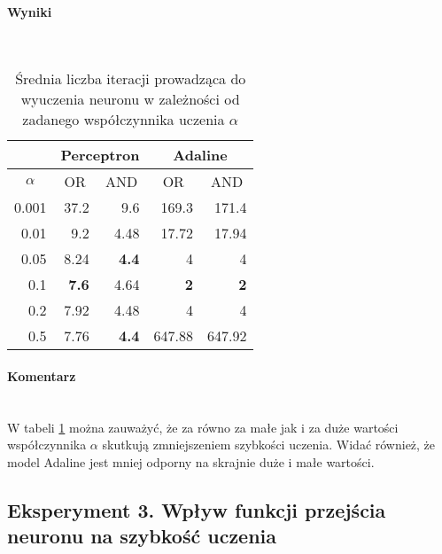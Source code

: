 \documentclass{article}
\begin{document}
	\paragraph{Wyniki}\mbox{}\\
	\begin{table}[H]
		\centering
		\caption{Średnia liczba iteracji prowadząca do wyuczenia neuronu w zależności od zadanego współczynnika uczenia $\alpha$}
		\label{tab:alpha}
		\begin{tabular}{|r|r|r|r|r|}
		\hline
			  & \multicolumn{2}{c|}{Perceptron}                    & \multicolumn{2}{c|}{Adaline}                       \\ \hline
		\multicolumn{1}{|c|}{$\alpha$} & \multicolumn{1}{c|}{OR} & \multicolumn{1}{c|}{AND} & \multicolumn{1}{c|}{OR} & \multicolumn{1}{c|}{AND} \\ \hline
		0.001 & 37.2                    & 9.6                      & 169.3                   & 171.4                    \\ \hline
		0.01  & 9.2                     & 4.48                     & 17.72                   & 17.94                    \\ \hline
		0.05  & 8.24                    & \textbf{4.4}             & 4                       & 4                        \\ \hline
		0.1   & \textbf{7.6}            & 4.64                     & \textbf{2}              & \textbf{2}               \\ \hline
		0.2   & 7.92                    & 4.48                     & 4                       & 4                        \\ \hline
		0.5   & 7.76                    & \textbf{4.4}             & 647.88                  & 647.92                   \\ \hline
		\end{tabular}
		\end{table}

	\paragraph{Komentarz}\mbox{}\\
	W tabeli \ref{tab:alpha} można zauważyć, że za równo za małe jak i za duże wartości współczynnika $\alpha$ skutkują zmniejszeniem szybkości uczenia.
	Widać również, że model Adaline jest mniej odporny na skrajnie duże i małe wartości.

	\subsection*{Eksperyment 3. Wpływ funkcji przejścia neuronu na szybkość uczenia}
\end{document}

